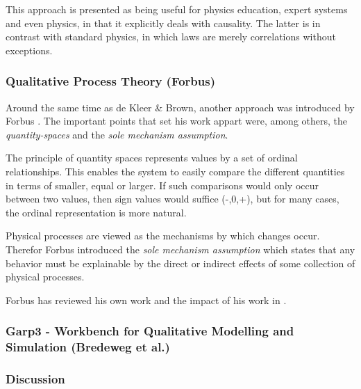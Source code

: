 \documentclass{article}
\begin{document}
This approach is presented as being useful for physics education, expert
systems and even physics, in that it explicitly deals with causality. The
latter is in contrast with standard physics, in which laws are merely
correlations without exceptions.


\subsubsection{Qualitative Process Theory (Forbus)}
Around the same time as de Kleer \& Brown, another approach was introduced by
Forbus \cite{forbus}. The important points that set his work appart were, among
others, the \emph{quantity-spaces} and the \emph{sole mechanism assumption}.

The principle of quantity spaces represents values by a set of ordinal
relationships. This enables the system to easily compare the different
quantities in terms of smaller, equal or larger. If such comparisons would only
occur between two values, then sign values would suffice (-,0,+), but for many
cases, the ordinal representation is more natural.

\vspace{0.8em}

Physical processes are viewed as the mechanisms by which changes occur. Therefor
Forbus introduced the \emph{sole mechanism assumption} which states that any
behavior must be explainable by the direct or indirect effects of some
collection of physical processes.

\vspace{0.8em}

Forbus has reviewed his own work and the impact of his work in \cite{forbus12}.

\subsubsection{Garp3 - Workbench for Qualitative Modelling and Simulation (Bredeweg et al.)}

\subsubsection{Discussion}
\end{document}
